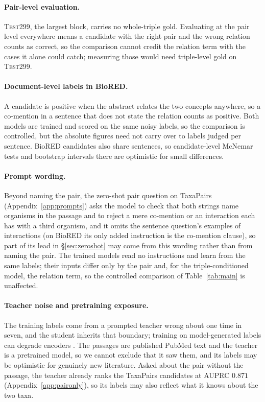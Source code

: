 \documentclass[11pt]{article}
\newcommand{\bench}{\mbox{TaxaPairs}}
\begin{document}
\paragraph{Pair-level evaluation.}
\textsc{Test299}, the largest block, carries no whole-triple gold. Evaluating at the pair level
everywhere means a candidate with the right pair and the wrong relation counts as correct, so the
comparison cannot credit the relation term with the cases it alone could catch; measuring those would
need triple-level gold on \textsc{Test299}.

\paragraph{Document-level labels in BioRED.}
A candidate is positive when the abstract relates the two concepts anywhere, so a co-mention
in a sentence that does not state the relation counts as positive. Both models are trained and scored
on the same noisy labels, so the comparison is controlled, but the absolute figures need not carry
over to labels judged per sentence. BioRED candidates also share sentences, so candidate-level McNemar
tests and bootstrap intervals there are optimistic for small differences.

\paragraph{Prompt wording.}
Beyond naming the pair, the zero-shot pair question on \bench{} (Appendix~\ref{app:prompts})
asks the model to check that both strings name organisms in the passage and to reject a mere
co-mention or an interaction each has with a third organism, and it omits the sentence question's
examples of interactions (on BioRED its only added instruction is the co-mention clause), so part
of its lead in \S\ref{sec:zeroshot} may come from this wording rather than from naming the pair. The
trained models read no instructions and learn from the same labels; their inputs differ only by the
pair and, for the triple-conditioned model, the relation term, so the controlled comparison of
Table~\ref{tab:main} is unaffected.

\paragraph{Teacher noise and pretraining exposure.}
The training labels come from a prompted teacher wrong about one time in seven, and the student
inherits that boundary; training on model-generated labels can degrade encoders
\citep{lu2025feeding}. The passages are published PubMed text and the teacher is a pretrained
model, so we cannot exclude that it saw them, and its labels may be optimistic for genuinely new
literature. Asked about the pair without the passage, the teacher already ranks the \bench{}
candidates at AUPRC $0.871$ (Appendix~\ref{app:paironly}), so its labels may also reflect what it
knows about the two taxa.
\end{document}
